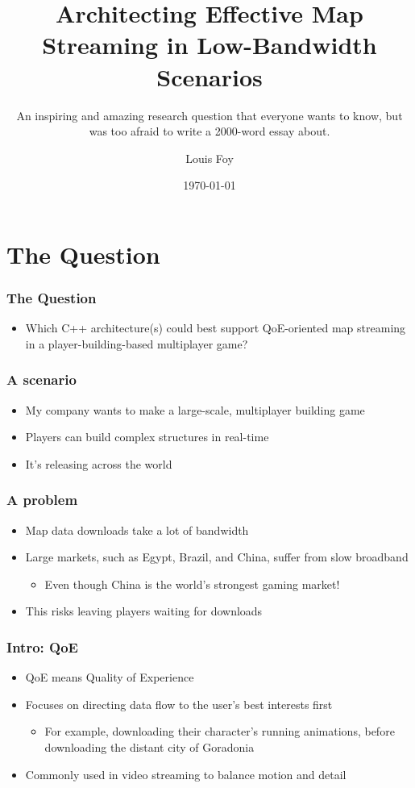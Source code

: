 \documentclass{beamer}
\title{Architecting Effective Map Streaming in Low-Bandwidth Scenarios}
\subtitle{An inspiring and amazing research question that everyone wants to know, but was too afraid to write a 2000-word essay about.}
\author{Louis Foy}
\institute{Falmouth University}
\date{\today}
\begin{document}
\begin{frame}
	\titlepage
\end{frame}

\section{The Question}
\begin{frame}
	\frametitle{The Question}
	\begin{itemize}
		\item Which C++ architecture(s) could best support QoE-oriented map streaming in a player-building-based multiplayer game?
	\end{itemize}
\end{frame}

\begin{frame}
	\frametitle{A scenario}
	\begin{itemize}
		\item My company wants to make a large-scale, multiplayer building game
		\item Players can build complex structures in real-time
		\item It\textquoteright s releasing across the world
	\end{itemize}
\end{frame}

\begin{frame}
	\frametitle{A problem}
	\begin{itemize}
		\item Map data downloads take a lot of bandwidth
		\item Large markets, such as Egypt, Brazil, and China, suffer from slow broadband 
		\begin{itemize}
			\item Even though China is the world’s strongest gaming market! \cite{chinamarket}
		\end{itemize}
		\item This risks leaving players waiting for downloads
	\end{itemize}
\end{frame}

\begin{frame}
\frametitle{Intro: QoE}
\begin{itemize}
	\item QoE means Quality of Experience
	\item Focuses on directing data flow to the user’s best interests first
	\begin{itemize}
		\item For example, downloading their character’s running animations, before downloading the distant city of Goradonia
	\end{itemize}
	\item Commonly used in video streaming to balance motion and detail
\end{itemize}
\end{frame}
\end{document}
